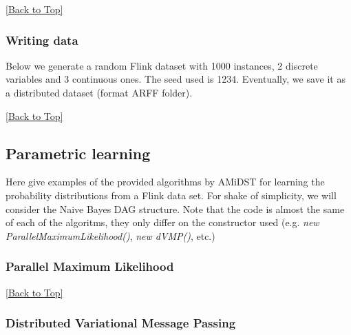 \documentclass[10pt,a4paper]{article}
\begin{document}


\hyperref[sec:flinklink]{[Back to Top]}\newline 


\subsubsection{Writing data}\label{sec:flinklink:io:write}


Below we generate a random Flink dataset with 1000 instances, 2 discrete variables and 3 continuous ones. The seed used is 1234. Eventually, we save it as a distributed dataset (format ARFF folder).

\hyperref[sec:flinklink]{[Back to Top]}\newline 




\subsection{Parametric learning}\label{sec:flinklink:learning}

Here give examples of the provided algorithms by AMiDST for learning the probability distributions from a Flink data set. For shake of simplicity, we will consider the Naive Bayes DAG structure. Note that the code is almost the same of each of the algoritms, they only differ on the constructor used (e.g. \textit{new ParallelMaximumLikelihood()}, \textit{new dVMP()}, etc.)


\subsubsection{Parallel Maximum Likelihood}\label{sec:flinklink:learning:pml}


\hyperref[sec:flinklink]{[Back to Top]}\newline 


\subsubsection{Distributed Variational Message Passing}\label{sec:flinklink:learning:dvmp}
\end{document}
